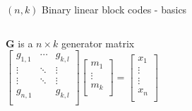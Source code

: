 \begin{frame}{$(n,k)$ Binary linear block codes - basics}
\begin{columns}[t]
\begin{block}{$\mathbf{G}$ is a $n \times k$ generator matrix}	
\[
\begin{bmatrix}
  g_{1,1} & \cdots & g_{k,l} \\
  \vdots & \ddots & \vdots \\
  \vdots & \ddots & \vdots \\
  g_{n,1} &  & g_{k,l} \\
\end{bmatrix}
\begin{bmatrix}
  m_1 \\
  \vdots \\
  m_k \\
\end{bmatrix}
=
\begin{bmatrix}
  x_1 \\
  \vdots \\
  \vdots \\
  x_n \\
\end{bmatrix}
\]
\end{block}


\end{columns}
\end{frame}
